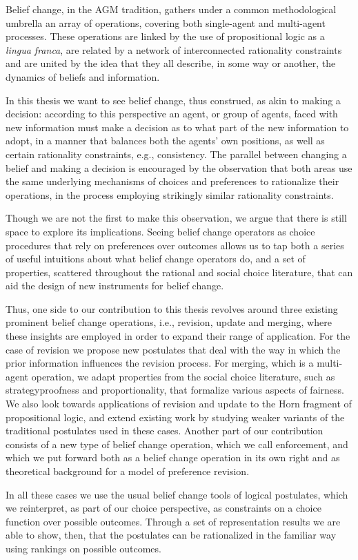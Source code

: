 Belief change, in the AGM tradition, 
gathers under a common methodological umbrella
an array of operations, covering both single-agent and multi-agent processes. 
These operations are linked by the use of propositional logic as a \emph{lingua franca},
are related by a network of interconnected rationality constraints
and are united by the idea that they all describe, 
in some way or another, the dynamics of beliefs and information. 

In this thesis we want to see belief change, thus construed,
as akin to making a decision: according to this perspective an agent,
or group of agents, faced with new information must make a decision 
as to what part of the new information to adopt, 
in a manner that balances both the agents' own positions,
as well as certain rationality constraints, e.g., consistency. 
The parallel between changing a belief and making a decision
is encouraged by the observation that 
both areas use the same underlying mechanisms of choices and preferences 
to rationalize their operations, in the process employing 
strikingly similar rationality constraints.

Though we are not the first to make this observation, 
we argue that there is still space to explore its implications.
Seeing belief change operators as choice procedures that rely on 
preferences over outcomes allows us to tap both a series of useful intuitions 
about what belief change operators do,
and a set of properties, scattered throughout the rational and social 
choice literature, that can aid the design of new instruments for belief change.

Thus, one side to our contribution to this thesis 
revolves around three existing prominent belief change operations,
i.e., revision, update and merging, where these insights are employed
in order to expand their range of application.
For the case of revision we propose new postulates 
that deal with the way in which the prior information influences the 
revision process. 
For merging, which is a multi-agent operation, we adapt properties 
from the social choice literature, such as strategyproofness 
and proportionality, that formalize various aspects of fairness.
We also look towards applications of revision and update to 
the Horn fragment of propositional logic, and extend existing work
by studying weaker variants of the traditional postulates 
used in these cases.
Another part of our contribution consists of a new type 
of belief change operation, which we call enforcement, 
and which we put forward both as a belief change operation 
in its own right and as theoretical 
background for a model of preference revision.

In all these cases we use the usual belief change tools 
of logical postulates, which we reinterpret,
as part of our choice perspective, as
constraints on a choice function over possible outcomes.
Through a set of representation results we are able to show, then,
that the postulates can be rationalized in the familiar way using 
rankings on possible outcomes.